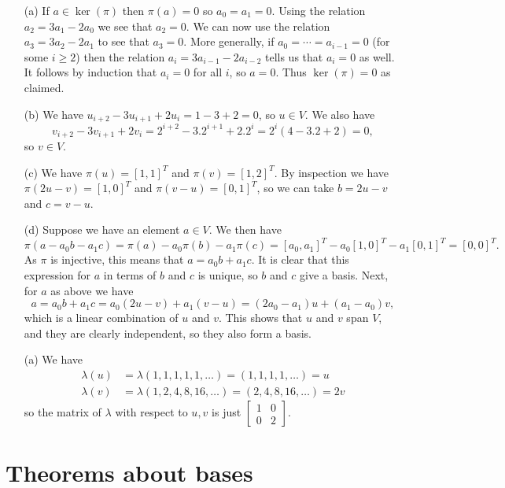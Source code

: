 \documentclass{amsart}
\newcommand{\bbm}       {\left[\begin{matrix}}
\newcommand{\ebm}       {\end{matrix}\right]}
\newcommand{\lm}        {\lambda}
\renewcommand{\:}       {\colon}
\theoremstyle{definition}
\renewenvironment{solution}{\SolutionAtEnd}{\endSolutionAtEnd}
\begin{document}
\begin{solution}
 \begin{itemize}
  \item[(a)] If $a\in\ker(\pi)$ then $\pi(a)=0$ so $a_0=a_1=0$.
   Using the relation $a_2=3a_1-2a_0$ we see that $a_2=0$.  We
   can now use the relation $a_3=3a_2-2a_1$ to see that $a_3=0$.
   More generally, if $a_0=\dotsb=a_{i-1}=0$ (for some $i\geq 2$)
   then the relation $a_i=3a_{i-1}-2a_{i-2}$ tells us that
   $a_i=0$ as well.  It follows by induction that $a_i=0$ for
   all $i$, so $a=0$.  Thus $\ker(\pi)=0$ as claimed.
  \item[(b)] We have $u_{i+2}-3u_{i+1}+2u_i=1-3+2=0$, so
   $u\in V$.  We also have
   \[ v_{i+2}-3v_{i+1}+2v_i = 2^{i+2}-3.2^{i+1}+2.2^i =
      2^i(4 - 3.2 +2) = 0,
   \]
   so $v\in V$.
  \item[(c)] We have $\pi(u)=[1,1]^T$ and $\pi(v)=[1,2]^T$.  By
  inspection we have $\pi(2u-v)=[1,0]^T$ and $\pi(v-u)=[0,1]^T$, so we
  can take $b=2u-v$ and $c=v-u$.
  \item[(d)] Suppose we have an element $a\in V$.  We then have
   \[ \pi(a - a_0b - a_1c) = \pi(a) - a_0\pi(b) - a_1\pi(c)
      = [a_0,a_1]^T - a_0[1,0]^T - a_1[0,1]^T = [0,0]^T.
   \]
   As $\pi$ is injective, this means that $a=a_0b+a_1c$.  It is
   clear that this expression for $a$ in terms of $b$ and $c$ is
   unique, so $b$ and $c$ give a basis.  Next, for $a$ as above
   we have
   \[ a=a_0b+a_1c=a_0(2u-v)+a_1(v-u) = (2a_0-a_1)u+(a_1-a_0)v,
   \]
   which is a linear combination of $u$ and $v$.  This shows
   that $u$ and $v$ span $V$, and they are clearly independent,
   so they also form a basis.
  \item[(a)] We have
   \begin{align*}
    \lm(u) &= \lm(1,1,1,1,1,\dotsc) = (1,1,1,1,\dotsc) = u \\
    \lm(v) &= \lm(1,2,4,8,16,\dotsc) = (2,4,8,16,\dotsc) = 2v
   \end{align*}
   so the matrix of $\lm$ with respect to $u,v$ is just
   $\bbm 1&0\\0&2\ebm$.
 \end{itemize}
\end{solution}

\section{Theorems about bases}
\label{sec-theorems}
\end{document}
